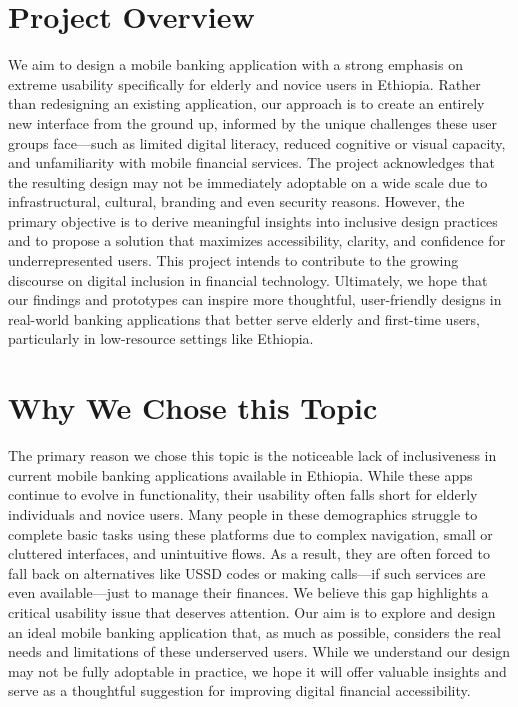 \documentclass[a4paper,12pt]{report}
\begin{document}
\section{Project Overview}
We aim to design a mobile banking application with a strong emphasis on extreme usability specifically for elderly and novice users in Ethiopia. Rather than redesigning an existing application, our approach is to create an entirely new interface from the ground up, informed by the unique challenges these user groups face—such as limited digital literacy, reduced cognitive or visual capacity, and unfamiliarity with mobile financial services. The project acknowledges that the resulting design may not be immediately adoptable on a wide scale due to infrastructural, cultural, branding and even security reasons. However, the primary objective is to derive meaningful insights into inclusive design practices and to propose a solution that maximizes accessibility, clarity, and confidence for underrepresented users. This project intends to contribute to the growing discourse on digital inclusion in financial technology. Ultimately, we hope that our findings and prototypes can inspire more thoughtful, user-friendly designs in real-world banking applications that better serve elderly and first-time users, particularly in low-resource settings like Ethiopia.

\section{Why We Chose this Topic}
The primary reason we chose this topic is the noticeable lack of inclusiveness in current mobile banking applications available in Ethiopia. While these apps continue to evolve in functionality, their usability often falls short for elderly individuals and novice users. Many people in these demographics struggle to complete basic tasks using these platforms due to complex navigation, small or cluttered interfaces, and unintuitive flows. As a result, they are often forced to fall back on alternatives like USSD codes or making calls—if such services are even available—just to manage their finances. We believe this gap highlights a critical usability issue that deserves attention. Our aim is to explore and design an ideal mobile banking application that, as much as possible, considers the real needs and limitations of these underserved users. While we understand our design may not be fully adoptable in practice, we hope it will offer valuable insights and serve as a thoughtful suggestion for improving digital financial accessibility.
\end{document}
